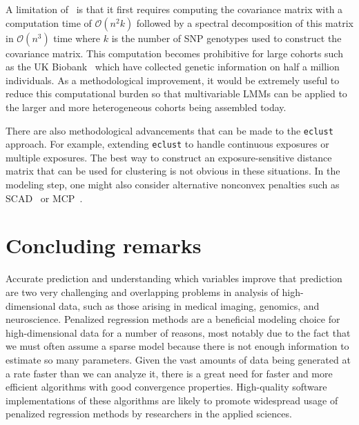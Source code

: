 A limitation of \ggmix ~is that it first requires computing the covariance matrix with a computation time of $\mathcal{O}(n^2k)$ followed by a spectral decomposition of this matrix in $\mathcal{O}(n^3)$ time where $k$ is the number of SNP genotypes used to construct the covariance matrix. This computation becomes prohibitive for large cohorts such as the UK Biobank~\citep{allen2012uk} which have collected genetic information on half a million individuals. As a methodological improvement, it would be extremely useful to reduce this computational burden so that multivariable LMMs can be applied to the larger and more heterogeneous cohorts being assembled today.  

There are also methodological advancements that can be made to the \texttt{eclust} approach. For example, extending \texttt{eclust} to handle continuous exposures or multiple exposures. The best way to construct an exposure-sensitive distance matrix that can be used for clustering is not obvious in these situations. In the modeling step, one might also consider alternative nonconvex penalties such as SCAD~\citep{fan2001variable} or MCP~\citep{zhang2010nearly}.

\section{Concluding remarks}

Accurate prediction and understanding which variables improve that prediction are two very challenging and overlapping problems in analysis of high-dimensional data, such as those arising in medical imaging, genomics, and neuroscience. Penalized regression methods are a beneficial modeling choice for high-dimensional data for a number of reasons, most notably due to the fact that we must often assume a sparse model because there is not enough information to estimate so many parameters. Given the vast amounts of data being generated at a rate faster than we can analyze it, there is a great need for faster and more efficient algorithms with good convergence properties. High-quality software implementations of these algorithms are likely to promote widespread usage of penalized regression methods by researchers in the applied sciences. 